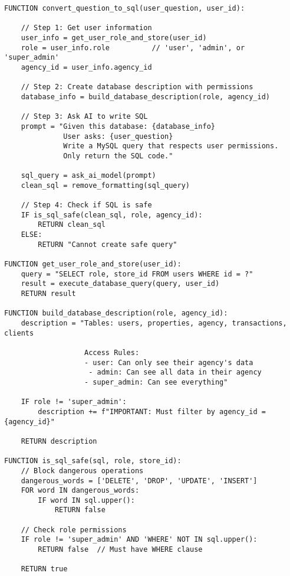\begin{verbatim}
FUNCTION convert_question_to_sql(user_question, user_id):
    
    // Step 1: Get user information
    user_info = get_user_role_and_store(user_id)
    role = user_info.role          // 'user', 'admin', or 'super_admin'
    agency_id = user_info.agency_id
    
    // Step 2: Create database description with permissions
    database_info = build_database_description(role, agency_id)
    
    // Step 3: Ask AI to write SQL
    prompt = "Given this database: {database_info}
              User asks: {user_question}
              Write a MySQL query that respects user permissions.
              Only return the SQL code."
    
    sql_query = ask_ai_model(prompt)
    clean_sql = remove_formatting(sql_query)
    
    // Step 4: Check if SQL is safe
    IF is_sql_safe(clean_sql, role, agency_id):
        RETURN clean_sql
    ELSE:
        RETURN "Cannot create safe query"

FUNCTION get_user_role_and_store(user_id):
    query = "SELECT role, store_id FROM users WHERE id = ?"
    result = execute_database_query(query, user_id)
    RETURN result

FUNCTION build_database_description(role, agency_id):
    description = "Tables: users, properties, agency, transactions, clients
                   
                   Access Rules:
                   - user: Can only see their agency's data
                    - admin: Can see all data in their agency  
                   - super_admin: Can see everything"
    
    IF role != 'super_admin':
        description += f"IMPORTANT: Must filter by agency_id = {agency_id}"
    
    RETURN description

FUNCTION is_sql_safe(sql, role, store_id):
    // Block dangerous operations
    dangerous_words = ['DELETE', 'DROP', 'UPDATE', 'INSERT']
    FOR word IN dangerous_words:
        IF word IN sql.upper():
            RETURN false
    
    // Check role permissions
    IF role != 'super_admin' AND 'WHERE' NOT IN sql.upper():
        RETURN false  // Must have WHERE clause
    
    RETURN true
\end{verbatim}

